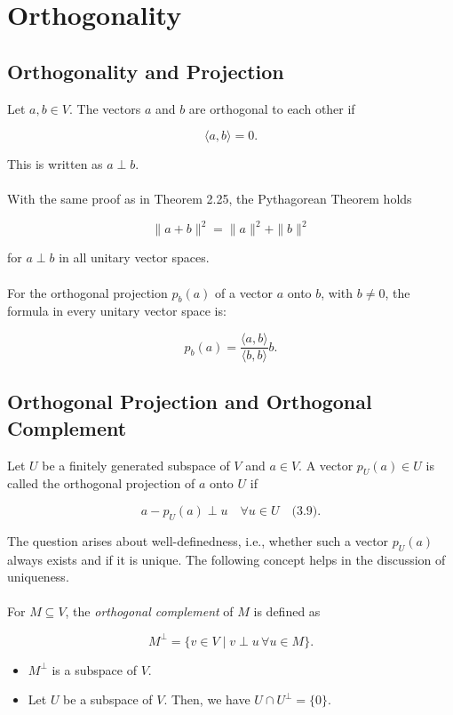 \newpage
\section{Orthogonality}

\subsection{Orthogonality and Projection}

Let \( a, b \in V \). The vectors \( a \) and \( b \) are orthogonal to each other if

\[
\langle a, b \rangle = 0.
\]

This is written as \( a \perp b \).
\\\\
With the same proof as in Theorem 2.25, the Pythagorean Theorem holds

\[
\|a + b\|^2 = \|a\|^2 + \|b\|^2
\]

for \( a \perp b \) in all unitary vector spaces.
\\\\
For the orthogonal projection \( p_b(a) \) of a vector \( a \) onto \( b \), with \( b \neq 0 \), the formula in every unitary vector space is:

\[
p_b(a) = \frac{\langle a, b \rangle}{\langle b, b \rangle} b.
\]

\subsection{Orthogonal Projection and Orthogonal Complement}

Let \( U \) be a finitely generated subspace of \( V \) and \( a \in V \). A vector \( p_U(a) \in U \) is called the orthogonal projection of \( a \) onto \( U \) if

\[
a - p_U(a) \perp u \quad \forall u \in U \quad \text{(3.9)}.
\]

The question arises about well-definedness, i.e., whether such a vector \( p_U(a) \) always exists and if it is unique. The following concept helps in the discussion of uniqueness.
\\\\
For \( M \subseteq V \), the \emph{orthogonal complement} of \( M \) is defined as

\[
M^\perp = \{ v \in V \mid v \perp u \, \forall u \in M \}.
\]

\begin{itemize}[label=\(-\)]
    \item \( M^\perp \) is a subspace of \( V \).
    \item Let \( U \) be a subspace of \( V \). Then, we have \( U \cap U^\perp = \{0\} \).
\end{itemize}

